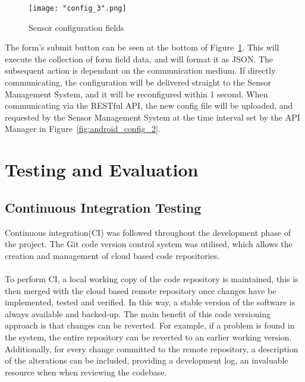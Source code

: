 \documentclass{article}
\begin{document}
\begin{figure}[H]
\centering
\texttt{[image: "config\_3".png]}
\caption{Sensor configuration fields}
\label{fig:android_config_4}
\end{figure}

\noindent
The form\rq s submit button can be seen at the bottom of Figure~\ref{fig:android_config_4}. This will execute the collection of form field data, and will format it as JSON. The subsequent action is dependant on the communication medium. If directly communicating, the configuration will be delivered straight to the Sensor Management System, and it will be reconfigured within 1 second. When communicating via the RESTful API, the new config file will be uploaded, and requested by the Sensor Management System at the time interval set by the API Manager in Figure~\ref{fig:android_config_2}.

\newpage
\section{Testing and Evaluation}
\subsection{Continuous Integration Testing}
Continuous integration(CI) was followed throughout the development phase of the project. The Git code version control system was utilised, which allows the creation and management of cloud based code repositories. \\\\
To perform CI, a local working copy of the code repository is maintained, this is then merged with the cloud based remote repository once changes have be implemented, tested and verified. In this way, a stable version of the software is always available and backed-up. The main benefit of this code versioning approach is that changes can be reverted. For example, if a problem is found in the system, the entire repository can be reverted to an earlier working version. Additionally, for every change committed to the remote repository, a description of the alterations can be included, providing a development log, an invaluable resource when when reviewing the codebase. 
\end{document}
